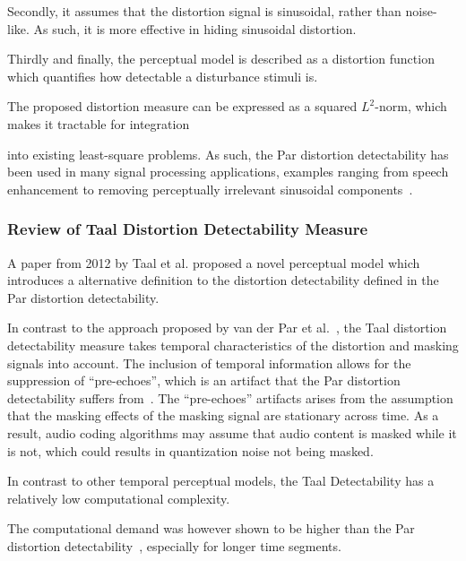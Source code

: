 Secondly, it assumes that the distortion signal is sinusoidal, rather than noise-like.
As such, it is more effective in hiding sinusoidal distortion.

Thirdly and finally, the perceptual model is described as a distortion function which quantifies how 
detectable a disturbance stimuli is.

The proposed distortion measure can be expressed as a squared $L^2$-norm, which makes it tractable for integration 
 
into existing least-square problems.
As such, the Par distortion detectability has been used in many signal processing applications, 
examples ranging from speech enhancement to removing perceptually irrelevant sinusoidal 
components~\cite{balazs2009time, taal2013optimal}.

\subsubsection{Review of Taal Distortion Detectability Measure}
A paper from 2012 by Taal et al. proposed a novel perceptual model \cite{taal2012low} which introduces a
alternative definition to the distortion detectability defined in the Par distortion detectability.

In contrast to the approach proposed by van der Par et al.~\cite{van2005perceptual},
the Taal distortion detectability measure takes temporal characteristics of the distortion and masking signals into account.
The inclusion of temporal information allows for the suppression of ``pre-echoes'', which is an artifact that 
the Par distortion detectability suffers from~\cite{taal2012low}. 
The ``pre-echoes'' artifacts arises from the assumption that the masking effects of the 
masking signal are stationary across time. 
As a result, audio coding algorithms may assume that audio content is masked while it is not, 
which could results in quantization noise not being masked.

In contrast to other temporal perceptual models, the Taal Detectability has a relatively low computational complexity.

The computational demand was however shown to be higher than the Par distortion detectability~\cite{taal2012low}, 
especially for longer time segments.

